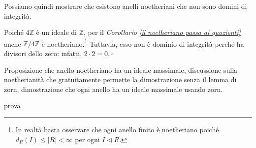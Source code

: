 \noindent Possiamo quindi mostrare che esistono anelli noetheriani che non sono domini di integrità.

\begin{exm}
  Poiché $4\mathbb{Z}$ è un ideale di $\mathbb{Z}$, per il \emph{Corollario \ref{il noetheriano passa ai quozienti}} 
  anche $\mathbb{Z}/4\mathbb{Z}$ è noetheriano.\footnote{In realtà basta osservare che ogni anello finito è noetheriano 
  poiché $d_R(I)\leq |R|<\infty$ per ogni $I\lhd R$.} 
  Tuttavia, esso non è dominio di integrità perché ha divisori dello zero: infatti, $2\cdot 2=0. \ \square$
\end{exm}

\noindent Proposizione che anello noetheriano ha un ideale massimale, discussione sulla noetherianità che gratuitamente 
permette la dimostrazione senza il lemma di zorn, dimostrazione che ogni anello ha un ideale massimale usando zorn.

\begin{obs}
prova
\end{obs}



\clearpage
